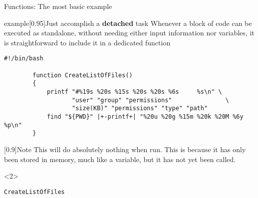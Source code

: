 \begin{frame}[fragile]{Functions: The most basic example}
    \vspace{-5mm}
    \begin{varblock}{example}[0.95\textwidth]{Just accomplish a \textbf{detached} task}
        Whenever a block of code can be executed as standalone, without needing either input information nor variables, it is straightforward to include it in a dedicated function
    \end{varblock}
    \begin{lstlisting}[style=MyBash, xrightmargin=1mm, xleftmargin=1mm]
        #!/bin/bash
        
        function CreateListOfFiles()
        {
            printf "#%19s %20s %15s %20s %20s %6s     %s\n" \
                   "user" "group" "permissions"               \
                   "size(KB)" "permissions" "type" "path"
            find "${PWD}" |+-printf+| "%20u %20g %15m %20k %20M %6y     %p\n"
        }
    \end{lstlisting}
    \begin{varblock}{}[0.9\textwidth]{Note}
        This will do absolutely nothing when run. This is because it has only been stored in memory, much like a variable, but it has not yet been called.
    \end{varblock}
    \begin{uncoverenv}<2>
        \begin{lstlisting}[style=MyBash, firstnumber=10, xrightmargin=1mm, xleftmargin=1mm]
            CreateListOfFiles
        \end{lstlisting}
    \end{uncoverenv}
\end{frame}
